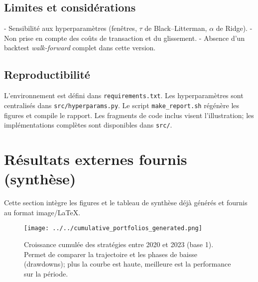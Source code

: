 \documentclass[11pt,a4paper]{article}
\begin{document}
\subsection*{Limites et considérations}
- Sensibilité aux hyperparamètres (fenêtres, \(\tau\) de Black--Litterman, \(\alpha\) de Ridge).
- Non prise en compte des coûts de transaction et du glissement.
- Absence d'un backtest \emph{walk-forward} complet dans cette version.

\subsection*{Reproductibilité}
L'environnement est défini dans \texttt{requirements.txt}. Les hyperparamètres sont centralisés dans \texttt{src/hyperparams.py}. Le script \texttt{make\_report.sh} régénère les figures et compile le rapport. Les fragments de code inclus visent l'illustration; les implémentations complètes sont disponibles dans \texttt{src/}.

\section*{Résultats externes fournis (synthèse)}
Cette section intègre les figures et le tableau de synthèse déjà générés et fournis au format image/\LaTeX{}.

\begin{figure}[h]
  \centering
  \texttt{[image: ../../cumulative\_portfolios\_generated.png]}
  \caption{Croissance cumulée des stratégies entre 2020 et 2023 (base 1). Permet de comparer la trajectoire et les phases de baisse (drawdowns); plus la courbe est haute, meilleure est la performance sur la période.}
  \label{fig:cum_external}
\end{figure}
\end{document}

